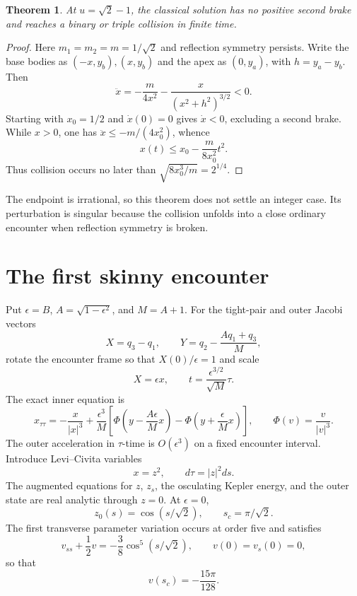 \documentclass[11pt]{article}
\newtheorem{theorem}{Theorem}
\begin{document}
\begin{theorem}
At $u=\sqrt2-1$, the classical solution has no positive second brake and
reaches a binary or triple collision in finite time.
\end{theorem}
\begin{proof}
Here $m_1=m_2=m=1/\sqrt2$ and reflection symmetry persists.  Write the base
bodies as $(-x,y_b),(x,y_b)$ and the apex as $(0,y_a)$, with
$h=y_a-y_b$.  Then
\[
\ddot x=-\frac{m}{4x^2}-\frac{x}{(x^2+h^2)^{3/2}}<0.
\]
Starting with $x_0=1/2$ and $\dot x(0)=0$ gives $\dot x<0$, excluding a
second brake.  While $x>0$, one has
$\ddot x\leq-m/(4x_0^2)$, whence
\[
x(t)\leq x_0-\frac{m}{8x_0^2}t^2.
\]
Thus collision occurs no later than $\sqrt{8x_0^3/m}=2^{1/4}$.
\end{proof}

The endpoint is irrational, so this theorem does not settle an integer case.
Its perturbation is singular because the collision unfolds into a close
ordinary encounter when reflection symmetry is broken.

\section{The first skinny encounter}

Put $\epsilon=B$, $A=\sqrt{1-\epsilon^2}$, and $M=A+1$. For the tight-pair
and outer Jacobi vectors
\[
X=q_3-q_1,\qquad Y=q_2-\frac{Aq_1+q_3}{M},
\]
rotate the encounter frame so that $X(0)/\epsilon=1$ and scale
\[
X=\epsilon x,\qquad t=\frac{\epsilon^{3/2}}{\sqrt M}\tau.
\]
The exact inner equation is
\[
x_{\tau\tau}=-\frac{x}{|x|^3}
+\frac{\epsilon^3}{M}\left[
\Phi\left(y-\frac{A\epsilon}{M}x\right)
-\Phi\left(y+\frac{\epsilon}{M}x\right)\right],
\qquad \Phi(v)=\frac{v}{|v|^3}.
\]
The outer acceleration in $\tau$-time is $O(\epsilon^3)$ on a fixed
encounter interval. Introduce Levi--Civita variables
\[
x=z^2,\qquad d\tau=|z|^2ds.
\]
The augmented equations for $z$, $z_s$, the osculating Kepler energy, and the
outer state are real analytic through $z=0$. At $\epsilon=0$,
\[
z_0(s)=\cos(s/\sqrt2),\qquad s_c=\pi/\sqrt2.
\]
The first transverse parameter variation occurs at order five and satisfies
\[
v_{ss}+\frac12v=-\frac38\cos^5(s/\sqrt2),\qquad
v(0)=v_s(0)=0,
\]
so that
\[
v(s_c)=-\frac{15\pi}{128}.
\]
\end{document}
